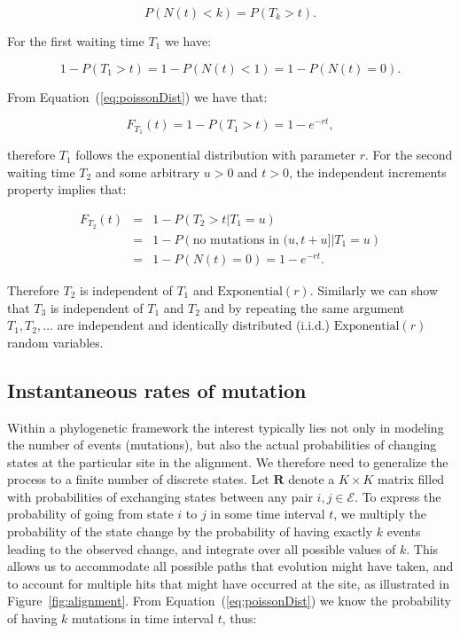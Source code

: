 \begin{equation}
P\left(N(t)<k\right)=P\left(T_{k}>t\right).
\end{equation}

\noindent
For the first waiting time $T_1$ we have:

\begin{equation}
1-P\left(T_{1}>t\right)=1-P\left(N(t)<1\right)=1-P\left(N(t)=0\right).
\end{equation}

\noindent
From Equation~(\ref{eq:poissonDist}) we have that:

\begin{equation}
F_{T_{1}}(t)=1-P\left(T_{1}>t\right)=1-e^{-r t},
\end{equation}

\noindent
therefore $T_1$ follows the exponential distribution with parameter $r$.
For the second waiting time $T_2$ and some arbitrary $u>0$ and $t>0$, the independent increments property implies that:

\begin{eqnarray}
F_{T_{2}}(t) &=& 1-P\left(T_{2}>t|T_{1}=u\right) \\ \nonumber
& = & 1-P\left(\text{no mutations in }(u,t+u]|T_{1}=u\right) \\ \nonumber 
& = & 1-P\left(N(t)=0\right)=1-e^{-r t}.
\end{eqnarray}

\noindent
Therefore $T_2$ is independent of $T_1$ and $\text{Exponential}(r)$. 
Similarly we can show that $T_3$ is independent of $T_1$ and $T_2$ and by repeating the same argument $T_1,T_2,\ldots$ are independent and identically distributed (i.i.d.) $\text{Exponential}(r)$ random variables.


\subsection{Instantaneous rates of mutation\label{sub:rates}}

Within a phylogenetic framework the interest typically lies not only in modeling the number of events (mutations), but also the actual probabilities of changing states at the particular site in the alignment. 
We therefore need to generalize the process to a finite number of discrete states.
Let $\mathbf{R}$ denote a $K \times K$ matrix filled with probabilities of exchanging states between any pair $i,j\in \mathcal{E}$.
To express the probability of going from state $i$ to $j$ in some time interval $t$, we multiply the probability of the state change by the probability of having exactly $k$ events leading to the observed change, and integrate over all possible values of $k$.
This allows us to accommodate all possible paths that evolution might have taken, and to account for multiple hits that might have occurred at the site, as illustrated in Figure~\ref{fig:alignment}.
From Equation~(\ref{eq:poissonDist}) we know the probability of having $k$ mutations in time interval $t$, thus:

